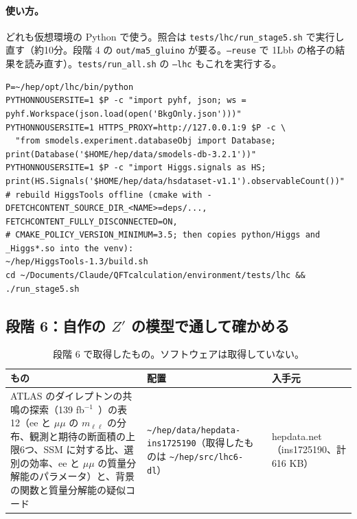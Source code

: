 \documentclass[a4paper,10pt]{ltjsarticle}
\newcommand{\pth}[1]{\texttt{\textasciitilde/}\nolinkurl{#1}}
\begin{document}
\paragraph{使い方。}どれも仮想環境の Python で使う。照合は \nolinkurl{tests/lhc/run_stage5.sh} で実行し直す（約10分。段階 4 の \texttt{out/ma5\_gluino} が要る。\texttt{--reuse} で 1Lbb の格子の結果を読み直す）。\texttt{tests/run\_all.sh} の \texttt{--lhc} もこれを実行する。
\begin{Verbatim}
P=~/hep/opt/lhc/bin/python
PYTHONNOUSERSITE=1 $P -c "import pyhf, json; ws = pyhf.Workspace(json.load(open('BkgOnly.json')))"
PYTHONNOUSERSITE=1 HTTPS_PROXY=http://127.0.0.1:9 $P -c \
  "from smodels.experiment.databaseObj import Database; print(Database('$HOME/hep/data/smodels-db-3.2.1'))"
PYTHONNOUSERSITE=1 $P -c "import Higgs.signals as HS; print(HS.Signals('$HOME/hep/data/hsdataset-v1.1').observableCount())"
# rebuild HiggsTools offline (cmake with -DFETCHCONTENT_SOURCE_DIR_<NAME>=deps/..., FETCHCONTENT_FULLY_DISCONNECTED=ON,
# CMAKE_POLICY_VERSION_MINIMUM=3.5; then copies python/Higgs and _Higgs*.so into the venv):
~/hep/HiggsTools-1.3/build.sh
cd ~/Documents/Claude/QFTcalculation/environment/tests/lhc && ./run_stage5.sh
\end{Verbatim}

\subsection{段階 6：自作の $Z'$ の模型で通して確かめる}\label{sec:lhc6}

\begin{table}[htbp]
\centering\small
\caption{段階 6 で取得したもの。ソフトウェアは取得していない。}
\label{tab:lhc6}
\begin{tabularx}{\linewidth}{>{\raggedright\arraybackslash}p{5.2cm}>{\raggedright\arraybackslash}X>{\raggedright\arraybackslash}p{4.0cm}}
\toprule
\textbf{もの} & \textbf{配置} & \textbf{入手元} \\
\midrule
ATLAS のダイレプトンの共鳴の探索（139 fb$^{-1}$~\cite{atlasll}）の表 12（ee と $\mu\mu$ の $m_{\ell\ell}$ の分布、観測と期待の断面積の上限6つ、SSM に対する比、選別の効率、ee と $\mu\mu$ の質量分解能のパラメータ）と、背景の関数と質量分解能の疑似コード & \pth{hep/data/hepdata-ins1725190}（取得したものは \pth{hep/src/lhc6-dl}） & hepdata.net（ins1725190、計 616 KB） \\
\bottomrule
\end{tabularx}
\end{table}
\end{document}
